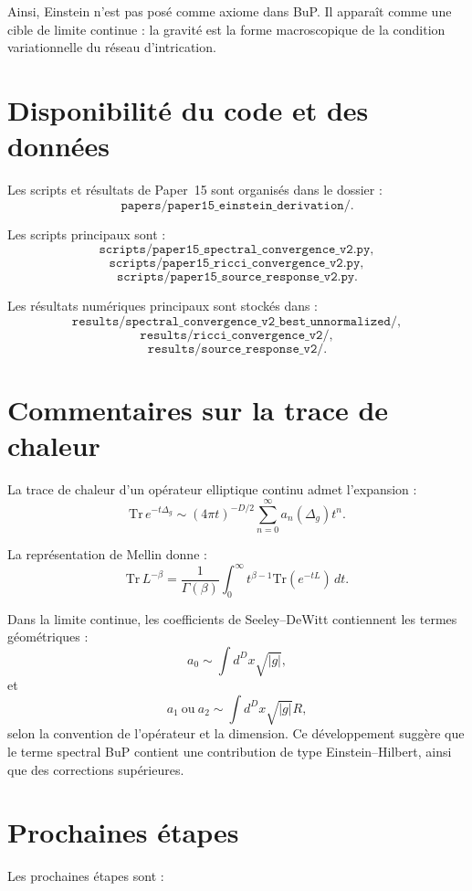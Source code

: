 \documentclass[11pt,a4paper]{article}
\begin{document}
Ainsi, Einstein n'est pas posé comme axiome dans BuP. Il apparaît comme une
cible de limite continue : la gravité est la forme macroscopique de la
condition variationnelle du réseau d'intrication.

\section*{Disponibilité du code et des données}

Les scripts et résultats de Paper~15 sont organisés dans le dossier :
\[
\texttt{papers/paper15\_einstein\_derivation/}.
\]

Les scripts principaux sont :
\[
\texttt{scripts/paper15\_spectral\_convergence\_v2.py},
\]
\[
\texttt{scripts/paper15\_ricci\_convergence\_v2.py},
\]
\[
\texttt{scripts/paper15\_source\_response\_v2.py}.
\]

Les résultats numériques principaux sont stockés dans :
\[
\texttt{results/spectral\_convergence\_v2\_best\_unnormalized/},
\]
\[
\texttt{results/ricci\_convergence\_v2/},
\]
\[
\texttt{results/source\_response\_v2/}.
\]

\appendix

\section{Commentaires sur la trace de chaleur}

La trace de chaleur d'un opérateur elliptique continu admet l'expansion :
\[
\mathrm{Tr}\,e^{-t\Delta_g}
\sim
(4\pi t)^{-D/2}
\sum_{n=0}^{\infty}
a_n(\Delta_g)t^n.
\]

La représentation de Mellin donne :
\[
\mathrm{Tr}\,L^{-\beta}
=
\frac{1}{\Gamma(\beta)}
\int_0^\infty
t^{\beta-1}
\mathrm{Tr}(e^{-tL})\,dt.
\]

Dans la limite continue, les coefficients de Seeley--DeWitt contiennent les
termes géométriques :
\[
a_0\sim \int d^Dx\sqrt{|g|},
\]
et
\[
a_1\ \text{ou}\ a_2
\sim
\int d^Dx\sqrt{|g|}R,
\]
selon la convention de l'opérateur et la dimension. Ce développement suggère
que le terme spectral BuP contient une contribution de type
Einstein--Hilbert, ainsi que des corrections supérieures.

\section{Prochaines étapes}

Les prochaines étapes sont :
\end{document}
